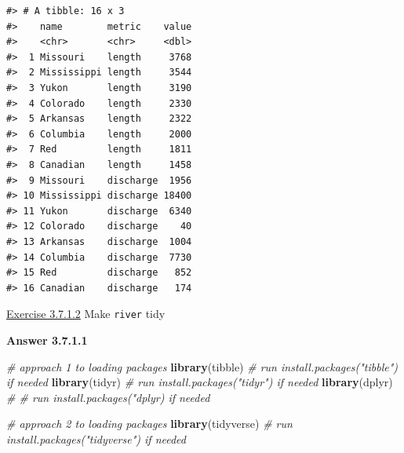 \documentclass[
]{book}
\newenvironment{Shaded}{\begin{snugshade}}{\end{snugshade}}
\newcommand{\CommentTok}[1]{\textcolor[rgb]{0.56,0.35,0.01}{\textit{#1}}}
\newcommand{\DataTypeTok}[1]{\textcolor[rgb]{0.13,0.29,0.53}{#1}}
\newcommand{\KeywordTok}[1]{\textcolor[rgb]{0.13,0.29,0.53}{\textbf{#1}}}
\newcommand{\NormalTok}[1]{#1}
\newcommand{\OperatorTok}[1]{\textcolor[rgb]{0.81,0.36,0.00}{\textbf{#1}}}
\newcommand{\StringTok}[1]{\textcolor[rgb]{0.31,0.60,0.02}{#1}}
\begin{document}
\begin{verbatim}
#> # A tibble: 16 x 3
#>    name        metric    value
#>    <chr>       <chr>     <dbl>
#>  1 Missouri    length     3768
#>  2 Mississippi length     3544
#>  3 Yukon       length     3190
#>  4 Colorado    length     2330
#>  5 Arkansas    length     2322
#>  6 Columbia    length     2000
#>  7 Red         length     1811
#>  8 Canadian    length     1458
#>  9 Missouri    discharge  1956
#> 10 Mississippi discharge 18400
#> 11 Yukon       discharge  6340
#> 12 Colorado    discharge    40
#> 13 Arkansas    discharge  1004
#> 14 Columbia    discharge  7730
#> 15 Red         discharge   852
#> 16 Canadian    discharge   174
\end{verbatim}

\protect\hyperlink{ex-set14}{Exercise 3.7.1.2}
Make \texttt{river} tidy

\textbf{Answer 3.7.1.1}

\begin{Shaded}
\begin{Highlighting}[]
\CommentTok{# approach 1 to loading packages}
\KeywordTok{library}\NormalTok{(tibble) }\CommentTok{# run install.packages("tibble") if needed}
\KeywordTok{library}\NormalTok{(tidyr) }\CommentTok{# run install.packages("tidyr") if needed}
\KeywordTok{library}\NormalTok{(dplyr) }\CommentTok{# # run install.packages("dplyr) if needed}
\end{Highlighting}
\end{Shaded}

\begin{Shaded}
\begin{Highlighting}[]
\CommentTok{# approach 2 to loading packages}
\KeywordTok{library}\NormalTok{(tidyverse) }\CommentTok{# run install.packages("tidyverse") if needed}
\end{Highlighting}
\end{Shaded}

\begin{Shaded}
\end{Shaded}
\end{document}
